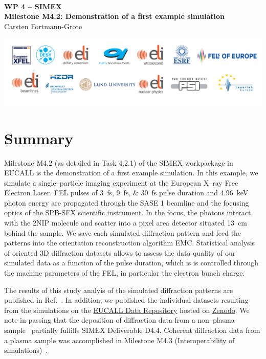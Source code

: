 \documentclass[12pt]{scrartcl}
\begin{document}
\makeatletter
\begin{titlepage}
\thispagestyle{scrheadings}
\begin{center}
  $~$\\
  \vspace{2cm}
  \Huge{\textbf{WP 4 -- SIMEX\\[1cm]
    Milestone M4.2: Demonstration of a first example simulation%
  }}\\
  \vspace{2cm}
  \large{ Carsten Fortmann-Grote}
  \vspace{1cm}
  \date{\today}
\end{center}
\vfill%
\includegraphics[width=\textwidth]{figures/PartnerLogos_2017}
\normalfont
\end{titlepage}
\makeatother
%
\tableofcontents
%
\section{Summary}
Milestone M4.2 (as detailed in Task 4.2.1) of the SIMEX workpackage in EUCALL is the demonstration of a
first example simulation. In this example, we simulate a single--particle
imaging experiment at the European X--ray Free Electron Laser. FEL pulses of
\SIlist{3;9;30}{\fs} pulse duration and \SI{4.96}{\keV} photon energy are propagated
through the SASE 1 beamline and the focusing optics of the SPB-SFX scientific
instrument. In the focus, the photons interact with the 2NIP molecule and
scatter into a pixel area detector situated \SI{13}{cm} behind the sample. We
save each simulated diffraction pattern and feed the patterns into the
orientation reconstruction algorithm EMC. Statistical analysis of oriented 3D
diffraction datasets allows to assess the data quality of our simulated data as
a function of the pulse duration, which is is controlled through the machine
parameters of the FEL, in particular the electron bunch charge.

The results of this study analyis of the simulated diffraction patterns are published in
Ref.~\cite{Fortmann-Grote2017}. In addition, we published the individual
datasets resulting from the simulations on the
\href{https://zenodo.org/communities/eucall-data}{EUCALL Data Repository} hosted
on \href{https://www.zenodo.org/}{Zenodo}. We note in passing that the
deposition of diffraction data from a non--plasma sample~\cite{Fortmann-Grote2017.zenodo.886087}
partially fulfills SIMEX Deliverable D4.4. Coherent diffraction data
from a plasma sample was accomplished in Milestone M4.3 (Interoperability of
simulations)~\cite{EUCALL_SIMEX_M4.3}.
\end{document}
